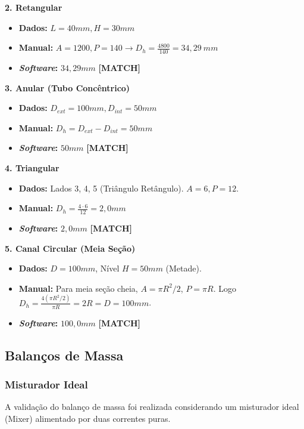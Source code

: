 \textbf{2. Retangular}
\begin{itemize}
    \item \textbf{Dados:} $L=40mm, H=30mm$
    \item \textbf{Manual:} $A=1200, P=140 \rightarrow D_h = \frac{4800}{140} = 34,29 \ mm$
    \item \textbf{\textit{Software}:} $34,29mm$ \textbf{[MATCH]}
\end{itemize}

\textbf{3. Anular (Tubo Concêntrico)}
\begin{itemize}
    \item \textbf{Dados:} $D_{ext}=100mm, D_{int}=50mm$
    \item \textbf{Manual:} $D_h = D_{ext} - D_{int} = 50mm$
    \item \textbf{\textit{Software}:} $50mm$ \textbf{[MATCH]}
\end{itemize}

\textbf{4. Triangular}
\begin{itemize}
    \item \textbf{Dados:} Lados 3, 4, 5 (Triângulo Retângulo). $A=6, P=12$.
    \item \textbf{Manual:} $D_h = \frac{4 \cdot 6}{12} = 2,0mm$
    \item \textbf{\textit{Software}:} $2,0mm$ \textbf{[MATCH]}
\end{itemize}

\textbf{5. Canal Circular (Meia Seção)}
\begin{itemize}
    \item \textbf{Dados:} $D=100mm$, Nível $H=50mm$ (Metade).
    \item \textbf{Manual:} Para meia seção cheia, $A = \pi R^2 / 2$, $P = \pi R$. Logo $D_h = \frac{4 (\pi R^2/2)}{\pi R} = 2R = D = 100mm$.
    \item \textbf{\textit{Software}:} $100,0mm$ \textbf{[MATCH]}
\end{itemize}

\subsection{Balanços de Massa}
\subsubsection{Misturador Ideal}

A validação do balanço de massa foi realizada considerando um misturador ideal (Mixer) alimentado por duas correntes puras.

